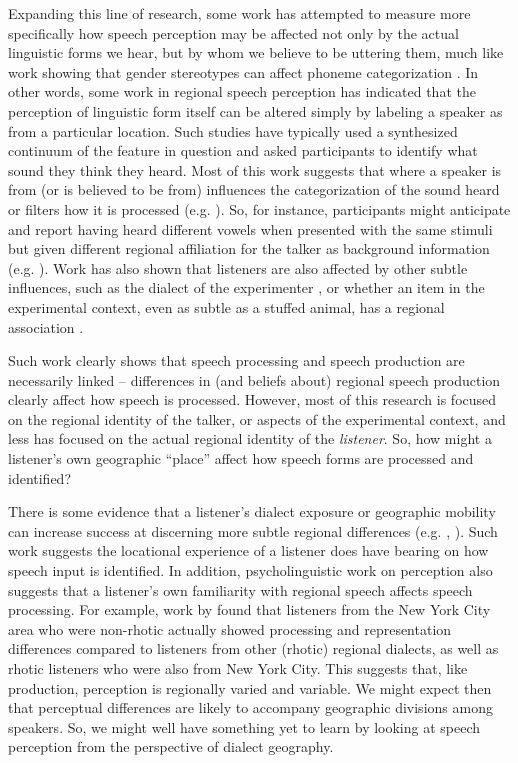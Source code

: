 \documentclass[output=paper]{LSP/langsci}
\begin{document}
Expanding this line of research, some work has attempted to measure more specifically how speech perception may be affected not only by the actual linguistic forms we hear, but by whom we believe to be uttering them, much like work showing that gender stereotypes can affect phoneme categorization \citep{strand_uncovering_1999}. In other words, some work in regional speech perception has indicated that the perception of linguistic form itself can be altered simply by labeling a speaker as from a particular location. Such studies have typically used a synthesized continuum of the feature in question and asked participants to identify what sound they think they heard. Most of this work suggests that where a speaker is from (or is believed to be from) influences the categorization of the sound heard or filters how it is processed (e.g. \citealt{allbritten_sounding_2011, labov_understanding_1997,plichta_/ay/s_2005}). So, for instance, participants might anticipate and report having heard different vowels when presented with the same stimuli but given different regional affiliation for the talker as background information (e.g. \citealt{niedzielski_effect_1999}). Work has also shown that listeners are also affected by other subtle influences, such as the dialect of the experimenter \citep{hay_factors_2006}, or whether an item in the experimental context, even as subtle as a stuffed animal, has a regional association \citep{hay_stuffed_2010}.

Such work clearly shows that speech processing and speech production are necessarily linked – differences in (and beliefs about) regional speech production clearly affect how speech is processed. However, most of this research is focused on the regional identity of the talker, or aspects of the experimental context, and less has focused on the actual regional identity of the \textit{listener}. So, how might a listener’s own geographic “place” affect how speech forms are processed and identified?  

There is some evidence that a listener’s dialect exposure or geographic mobility can increase success at discerning more subtle regional differences (e.g. \citealt{clopper_free_2007}, \citealt{evans_vowel_2004}). Such work suggests the locational experience of a listener does have bearing on how speech input is identified. In addition, psycholinguistic work on perception also suggests that a listener’s own familiarity with regional speech affects speech processing. For example, work by \citet{sumner_effect_2009} found that listeners from the New York City area who were non-rhotic actually showed processing and representation differences compared to listeners from other (rhotic) regional dialects, as well as rhotic listeners who were also from New York City. This suggests that, like production, perception is regionally varied and variable. We might expect then that perceptual differences are likely to accompany geographic divisions among speakers. So, we might well have something yet to learn by looking at speech perception from the perspective of dialect geography. 
\end{document}
